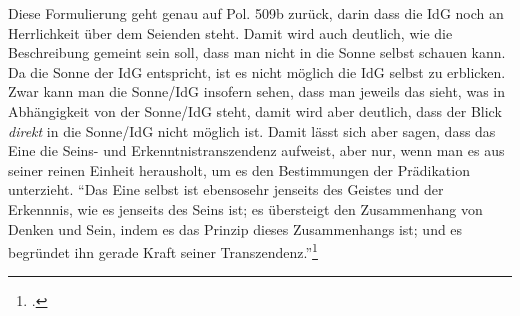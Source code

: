Diese Formulierung geht genau auf Pol. 509b zurück, darin dass die IdG noch an Herrlichkeit über dem Seienden steht. Damit wird auch deutlich, wie die Beschreibung gemeint sein soll, dass man nicht in die Sonne selbst schauen kann. Da die Sonne der IdG entspricht, ist es nicht möglich die IdG selbst zu erblicken. Zwar kann man die Sonne/IdG insofern sehen, dass man jeweils das sieht, was in Abhängigkeit von der Sonne/IdG steht, damit wird aber deutlich, dass der Blick \emph{direkt} in die Sonne/IdG nicht möglich ist.
Damit lässt sich aber sagen, dass das Eine die Seins- und Erkenntnistranszendenz aufweist, aber nur, wenn man es aus seiner reinen Einheit herausholt, um es den Bestimmungen der Prädikation unterzieht. \enquote{Das Eine selbst ist ebensosehr jenseits des Geistes und der Erkennnis, wie es jenseits des Seins ist; es übersteigt den Zusammenhang von Denken und Sein, indem es das Prinzip dieses Zusammenhangs ist; und es begründet ihn gerade Kraft seiner Transzendenz.}\footcite[][S. 102]{halfwassen2015spuren}
